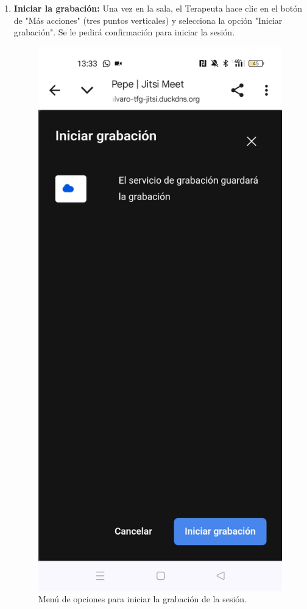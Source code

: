 \begin{enumerate}
    \item \textbf{Iniciar la grabación:} Una vez en la sala, el Terapeuta hace clic en el botón de "Más acciones" (tres puntos verticales) y selecciona la opción "Iniciar grabación". Se le pedirá confirmación para iniciar la sesión.
    \begin{figure}[H]
    \centering
    \includegraphics[height=0.6\textheight]{img/iniciargrabacion.jpg}
    \caption{Menú de opciones para iniciar la grabación de la sesión.}
    \label{fig:manual_iniciar_grabacion}
    \end{figure}
    

\end{enumerate}
